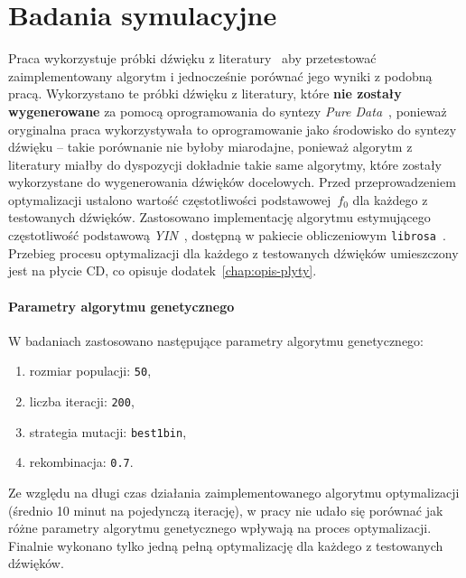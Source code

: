 \chapter{Badania symulacyjne}\label{chap:research}



Praca wykorzystuje próbki dźwięku z literatury~\cite{evolutionary_puredata_results}
aby przetestować zaimplementowany algorytm i jednocześnie porównać jego wyniki
z podobną pracą. Wykorzystano te próbki dźwięku
z literatury, które \textbf{nie zostały wygenerowane} za pomocą
oprogramowania do syntezy \textit{Pure Data}~\cite{pure_data},
ponieważ oryginalna praca wykorzystywała
to oprogramowanie jako środowisko do syntezy dźwięku -- takie porównanie
nie byłoby miarodajne, ponieważ algorytm z literatury miałby do dyspozycji
dokładnie takie same algorytmy, które zostały wykorzystane do wygenerowania
dźwięków docelowych.
Przed przeprowadzeniem optymalizacji ustalono wartość częstotliwości podstawowej~$f_0$
dla każdego z testowanych dźwięków. Zastosowano implementację algorytmu
estymującego częstotliwość podstawową
\textit{YIN}~\cite{yin_pitch_estimation}, dostępną w pakiecie obliczeniowym
\texttt{librosa}~\cite{librosa}. Przebieg procesu optymalizacji dla każdego z testowanych
dźwięków umieszczony jest na płycie CD, co opisuje dodatek~\ref{chap:opis-plyty}.

\subsubsection{Parametry algorytmu genetycznego}

W badaniach zastosowano następujące parametry algorytmu genetycznego:

\begin{enumerate}
  \item rozmiar populacji: \texttt{50},
  \item liczba iteracji: \texttt{200},
  \item strategia mutacji: \texttt{best1bin},
  \item rekombinacja: \texttt{0.7}.
\end{enumerate}

Ze względu na długi czas działania zaimplementowanego algorytmu optymalizacji
(średnio 10 minut na pojedynczą iterację),
w pracy nie udało się porównać jak różne parametry algorytmu genetycznego
wpływają na proces optymalizacji. Finalnie wykonano tylko jedną pełną optymalizację
dla każdego z testowanych dźwięków.

